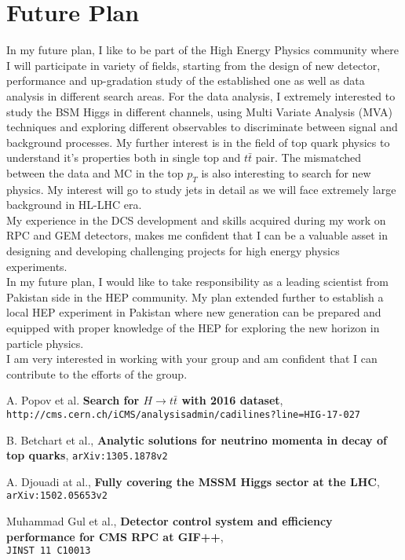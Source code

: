 \documentclass[12pt]{article}
\begin{document}
\section*{Future Plan}
In my future plan, I like to be part of the High Energy Physics community where I will participate in variety of fields, starting from the design of new detector, performance and up-gradation study of the established one as well as data analysis in different search areas. For the data analysis, I extremely interested to study the BSM Higgs in different channels, using Multi Variate Analysis (MVA) techniques and exploring different observables to discriminate between signal and background processes. My further interest is in the field of top quark physics to understand it's properties both in single top and $t\bar t$ pair. The mismatched between the data and MC in the top $p_{T}$ is also interesting to search for new physics. My interest will go to study jets in detail as we will face extremely large background in HL-LHC era.\\   
My experience in the DCS development and skills acquired during my work on RPC and GEM detectors, makes me confident that I can be a valuable asset in designing and developing challenging projects for high energy physics experiments.\\
In my future plan, I would like to take responsibility as a leading scientist from Pakistan side in the HEP community. My plan extended further to establish a local HEP experiment in Pakistan where new generation can be prepared and equipped with proper knowledge of the HEP for exploring the new horizon in particle physics.\\
I am very interested in working with your group and am confident that I can contribute to the efforts of the group.\\
\begin{thebibliography}{9}
A. Popov et al. 
\textbf{Search for $H\rightarrow t \bar t$ with 2016 dataset},
\texttt{http://cms.cern.ch/iCMS/analysisadmin/cadilines?line=HIG-17-027}

B. Betchart et al., 
\textbf{Analytic solutions for neutrino momenta in decay of top quarks},
\texttt{arXiv:1305.1878v2}
 
A. Djouadi at al.,
\textbf{Fully covering the MSSM Higgs sector at the LHC},
\\\texttt{arXiv:1502.05653v2}

Muhammad Gul et al.,
\textbf{Detector control system and efficiency performance for CMS RPC at GIF++},
\\\texttt{JINST 11 C10013}
\end{thebibliography}
\end{document}
